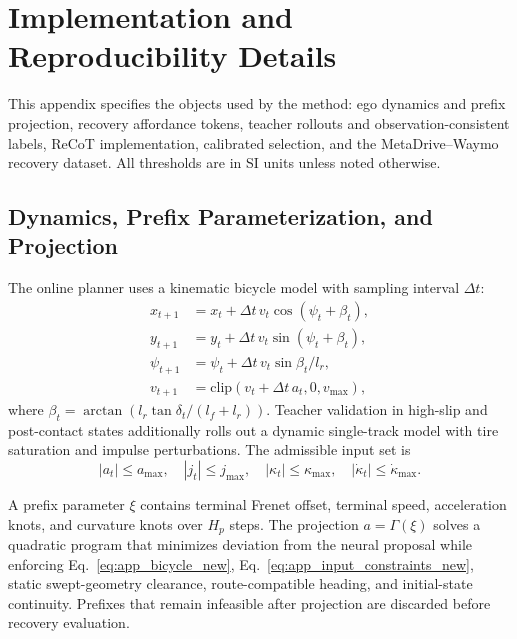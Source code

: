\documentclass[conference]{IEEEtran}
\begin{document}
\appendix
\section{Implementation and Reproducibility Details}
\label{app:implementation_new}

This appendix specifies the objects used by the method: ego dynamics and prefix projection, recovery affordance tokens, teacher rollouts and observation-consistent labels, ReCoT implementation, calibrated selection, and the MetaDrive--Waymo recovery dataset.  All thresholds are in SI units unless noted otherwise.

\subsection{Dynamics, Prefix Parameterization, and Projection}
\label{app:action_parameterization_new}

The online planner uses a kinematic bicycle model with sampling interval $\Delta t$:
\begin{equation}
\label{eq:app_bicycle_new}
\begin{split}
    x_{t+1}&=x_t+\Delta t\,v_t\cos(\psi_t+\beta_t),\\
    y_{t+1}&=y_t+\Delta t\,v_t\sin(\psi_t+\beta_t),\\
    \psi_{t+1}&=\psi_t+\Delta t\,{v_t}\sin\beta_t/l_r,\\
    v_{t+1}&=\mathrm{clip}(v_t+\Delta t\,a_t,0,v_{\max}),
\end{split}
\end{equation}
where $\beta_t=\arctan(l_r\tan\delta_t/(l_f+l_r))$.  Teacher validation in high-slip and post-contact states additionally rolls out a dynamic single-track model with tire saturation and impulse perturbations.  The admissible input set is
\begin{equation}
\label{eq:app_input_constraints_new}
    |a_t|\le a_{\max},\quad |j_t|\le j_{\max},\quad
    |\kappa_t|\le\kappa_{\max},\quad |\dot\kappa_t|\le\dot\kappa_{\max}.
\end{equation}

A prefix parameter $\xi$ contains terminal Frenet offset, terminal speed, acceleration knots, and curvature knots over $H_p$ steps.  The projection $a=\Gamma(\xi)$ solves a quadratic program that minimizes deviation from the neural proposal while enforcing Eq.~\eqref{eq:app_bicycle_new}, Eq.~\eqref{eq:app_input_constraints_new}, static swept-geometry clearance, route-compatible heading, and initial-state continuity.  Prefixes that remain infeasible after projection are discarded before recovery evaluation.
\end{document}

